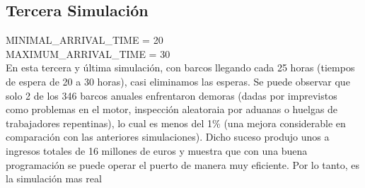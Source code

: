 \documentclass[12pt]{article}
\begin{document}
    \subsection{Tercera Simulación}
    MINIMAL\_ARRIVAL\_TIME = 20 \\
    MAXIMUM\_ARRIVAL\_TIME = 30 \\

    En esta tercera y última simulación, con barcos llegando cada 25 horas (tiempos de espera de 20 a 30 horas), casi eliminamos las esperas. Se puede observar que solo 2 de los 346 barcos anuales enfrentaron demoras (dadas por imprevistos como problemas en el motor, inspección aleatoraia por aduanas o huelgas de trabajadores repentinas), lo cual es menos del 1\% (una mejora considerable en comparación con las anteriores simulaciones). Dicho suceso produjo unos a ingresos totales de 16 millones de euros y muestra que con una buena programación se puede operar el puerto de manera muy eficiente. Por lo tanto, es la simulación mas real
\end{document}
